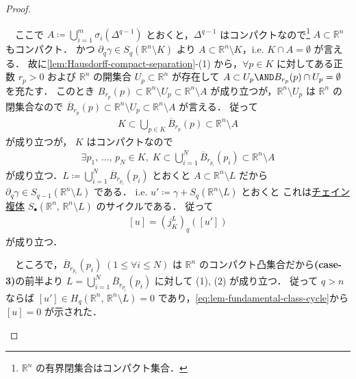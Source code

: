 \documentclass[algtopo_main]{subfiles}
\begin{document}
\begin{proof}
\begin{description}
\begin{description}
            　ここで $A \coloneqq \bigcup_{i=1}^m \sigma_i(\Delta^{q-1})$ とおくと，$\Delta^{q-1}$ はコンパクトなので\footnote{$\mathbb{R}^n$ の有界閉集合はコンパクト集合．} $A \subset \mathbb{R}^n$ もコンパクト．
            かつ $\partial_q\gamma \in S_q(\mathbb{R}^n \setminus K)$ より $A \subset \mathbb{R}^n \setminus K$，i.e. $K \cap A = \emptyset$ が言える．
            故に\ref{lem:Hausdorff-compact-separation}-(1) から，$\forall p \in K$ に対してある正数 $r_p > 0$ および $\mathbb{R}^n$ の開集合 $U_p \subset \mathbb{R}^n$ が存在して $A \subset U_p \AND B_{r_p}(p) \cap U_p = \emptyset$ を充たす．
            このとき $B_{r_p}(p) \subset \mathbb{R}^n \setminus U_p \subset \mathbb{R}^n \setminus A$ が成り立つが，$\mathbb{R}^n \setminus U_p$ は $\mathbb{R}^n$ の閉集合なので $\overline{B}_{r_p}(p) \subset \mathbb{R}^n \setminus U_p \subset \mathbb{R}^n \setminus A$ が言える．
            従って
            \begin{align}
                K \subset \bigcup_{p \in K} \overline{B}_{r_p}(p) \subset \mathbb{R}^n \setminus A
            \end{align}
            が成り立つが，
            $K$ はコンパクトなので
            \begin{align}
                \exists p_1,\, \dots ,\, p_N \in K,\; K \subset \bigcup_{i=1}^N \overline{B}_{r_{p_i}}(p_i) \subset \mathbb{R}^n \setminus A
            \end{align}
            が成り立つ．$L \coloneqq \bigcup_{i=1}^N \overline{B}_{r_{p_i}}(p_i)$ とおくと
            $A \subset \mathbb{R}^n \setminus L$ だから 
            $\partial_q \gamma \in S_{q-1}\left(\mathbb{R}^n \setminus L\right)$ である．
            i.e. $u' \coloneqq \gamma + S_q(\mathbb{R}^n \setminus L)$ とおくと
            これは\hyperref[def:CC]{チェイン複体} $S_\bullet (\mathbb{R}^n,\, \mathbb{R}^n \setminus L)$ のサイクルである．
            従って
            \begin{align}
                \label{eq:lem-fundamental-class-cycle}
                [u] = (j^L_K)_q ([u'])
            \end{align}
            が成り立つ．

            　ところで，$\overline{B}_{r_{p_i}}(p_i)\; (1 \le \forall i \le N)$ は $\mathbb{R}^n$ のコンパクト凸集合だから\textbf{\textsf{(case-3)}}の前半より $L = \bigcup_{i=1}^N \overline{B}_{r_{p_i}}(p_i)$ に対して (1), (2) が成り立つ．
            従って $q > n$ ならば $[u'] \in H_q \left(\mathbb{R}^n,\, \mathbb{R}^n \setminus L \right) = 0$ であり，\eqref{eq:lem-fundamental-class-cycle}から $[u] = 0$ が示された．


\end{description}
\end{description}
\end{proof}
\end{document}
